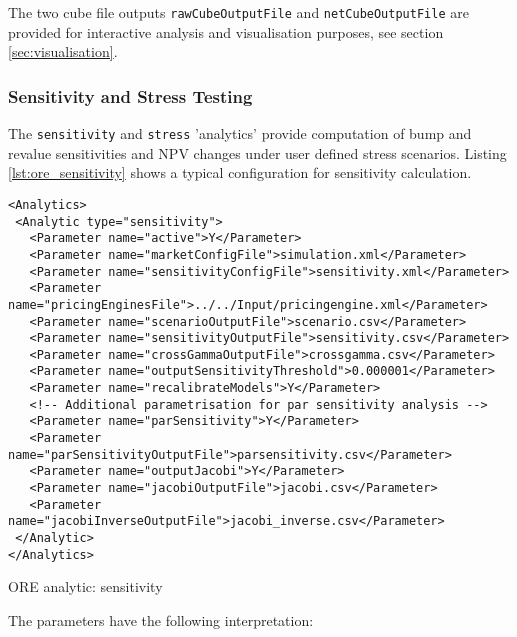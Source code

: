 {The two cube file outputs {\tt rawCubeOutputFile} and {\tt netCubeOutputFile} are provided for interactive analysis and visualisation purposes, see section
\ref{sec:visualisation}.

\subsubsection{Sensitivity and Stress Testing}

The {\tt sensitivity} and {\tt stress} 'analytics' provide computation of bump and revalue
sensitivities and NPV changes under user defined stress scenarios. Listing \ref{lst:ore_sensitivity}
shows a typical configuration for sensitivity calculation.

\begin{listing}[H]
\begin{verbatim}
<Analytics>
 <Analytic type="sensitivity">
   <Parameter name="active">Y</Parameter>
   <Parameter name="marketConfigFile">simulation.xml</Parameter>
   <Parameter name="sensitivityConfigFile">sensitivity.xml</Parameter>
   <Parameter name="pricingEnginesFile">../../Input/pricingengine.xml</Parameter>
   <Parameter name="scenarioOutputFile">scenario.csv</Parameter>
   <Parameter name="sensitivityOutputFile">sensitivity.csv</Parameter>
   <Parameter name="crossGammaOutputFile">crossgamma.csv</Parameter>
   <Parameter name="outputSensitivityThreshold">0.000001</Parameter>
   <Parameter name="recalibrateModels">Y</Parameter>
   <!-- Additional parametrisation for par sensitivity analysis -->
   <Parameter name="parSensitivity">Y</Parameter>
   <Parameter name="parSensitivityOutputFile">parsensitivity.csv</Parameter>
   <Parameter name="outputJacobi">Y</Parameter>
   <Parameter name="jacobiOutputFile">jacobi.csv</Parameter>
   <Parameter name="jacobiInverseOutputFile">jacobi_inverse.csv</Parameter>
 </Analytic>
</Analytics>
\end{verbatim}
\caption{ORE analytic: sensitivity}
\label{lst:ore_sensitivity}
\end{listing}

The parameters have the following interpretation:

}
